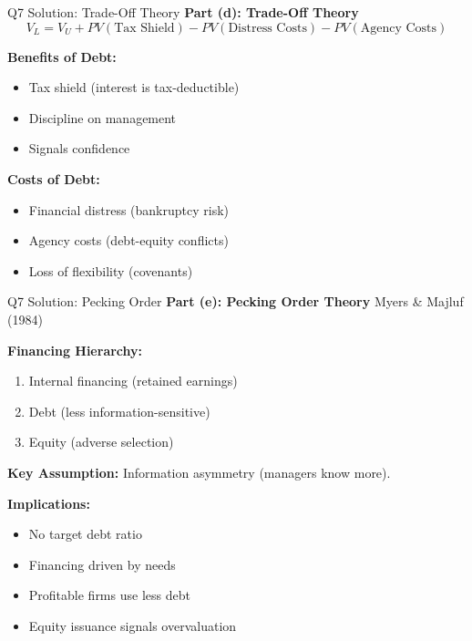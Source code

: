 \documentclass[aspectratio=169,10pt]{beamer}
\renewcommand{\small}{\fontsize{6pt}{7.5pt}\selectfont}
\renewcommand{\large}{\fontsize{8pt}{10pt}\selectfont}
\newcommand{\question}[1]{{\large\bfseries\color{crimson}#1}}
\begin{document}
	\begin{frame}{Q7 Solution: Trade-Off Theory}
		\question{Part (d): Trade-Off Theory}
		\small
		\[
		V_L = V_U + PV(\text{Tax Shield}) - PV(\text{Distress Costs}) - PV(\text{Agency Costs})
		\]
		
		\vspace{0.1cm}
		\textbf{Benefits of Debt:}
		\begin{itemize}
			\item Tax shield (interest is tax-deductible)
			\item Discipline on management
			\item Signals confidence
		\end{itemize}
		
		\vspace{0.1cm}
		\textbf{Costs of Debt:}
		\begin{itemize}
			\item Financial distress (bankruptcy risk)
			\item Agency costs (debt-equity conflicts)
			\item Loss of flexibility (covenants)
		\end{itemize}
	\end{frame}
	
	\begin{frame}{Q7 Solution: Pecking Order}
		\question{Part (e): Pecking Order Theory}
		\small
		Myers \& Majluf (1984)
		
		\vspace{0.1cm}
		\textbf{Financing Hierarchy:}
		\begin{enumerate}
			\item Internal financing (retained earnings)
			\item Debt (less information-sensitive)
			\item Equity (adverse selection)
		\end{enumerate}
		
		\vspace{0.1cm}
		\textbf{Key Assumption:} Information asymmetry (managers know more).
		
		\vspace{0.1cm}
		\textbf{Implications:}
		\begin{itemize}
			\item No target debt ratio
			\item Financing driven by needs
			\item Profitable firms use less debt
			\item Equity issuance signals overvaluation
		\end{itemize}
	\end{frame}
	
\end{document}

